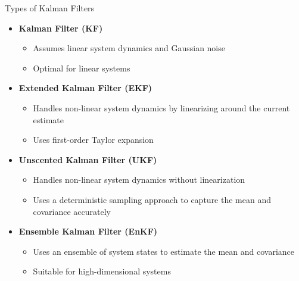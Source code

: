 \documentclass[aspectratio=169]{beamer}
\begin{document}
\begin{frame}{Types of Kalman Filters}
    \footnotesize
    \begin{itemize}
        \item \textbf{Kalman Filter (KF)}
              \begin{itemize}
                  \item Assumes linear system dynamics and Gaussian noise
                  \item Optimal for linear systems
              \end{itemize}
        \item \textbf{Extended Kalman Filter (EKF)}
              \begin{itemize}
                  \item Handles non-linear system dynamics by linearizing around the current estimate
                  \item Uses first-order Taylor expansion
              \end{itemize}
        \item \textbf{Unscented Kalman Filter (UKF)}
              \begin{itemize}
                  \item Handles non-linear system dynamics without linearization
                  \item Uses a deterministic sampling approach to capture the mean and covariance accurately
              \end{itemize}
        \item \textbf{Ensemble Kalman Filter (EnKF)}
              \begin{itemize}
                  \item Uses an ensemble of system states to estimate the mean and covariance
                  \item Suitable for high-dimensional systems
              \end{itemize}
    \end{itemize}
\end{frame}
\end{document}
